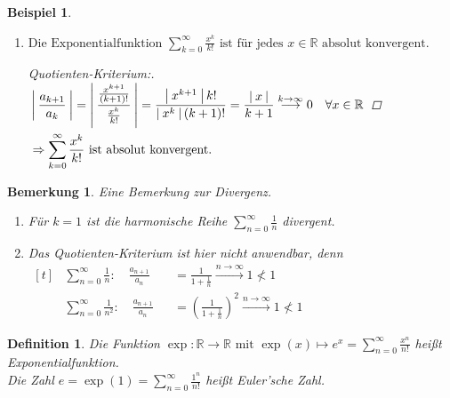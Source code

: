 \documentclass[a4paper,titlepage,oneside]{article}
\def\R{\ensuremath{\mathbb{R}} }
\def\e{\ensuremath{\mathit{e}} }
\def\sp{\hspace{0,1cm}}
\newcommand{\suminf}[2][n]{\ensuremath{\sum_{#1= 0}^{\infty}{#2}}}
\newcommand{\abs}[1]{\ensuremath{\left|\:#1\:\right|}}
\newcommand{\longtoinf}[1][n]{\ensuremath{\overset{\scriptscriptstyle{#1 \to \infty}}{\longrightarrow}}}
\theoremstyle{thmstyle}
\newtheorem{defi}[satz]{Definition}
\newtheorem{bsp}[satz]{Beispiel}
\newtheorem{bem}[satz]{Bemerkung}
\theoremstyle{subthmstyle}
\begin{document}
\begin{bsp}
\begin{enumerate}
\item
$\displaystyle\text{Die Exponentialfunktion } \suminf[k]{\frac{x^k}{k!}} \text{ ist für jedes } x \in \R \text{ absolut konvergent.}$

\begin{proof}[Quotienten-Kriterium:]\sp\\
\begin{math}\displaystyle \begin{aligned}[t]
&\abs{\frac{a_{k+1}}{a_k}} = \abs{\frac{\frac{x^{k+1}}{(k+1)!}}{\frac{x^k}{k!}}} = \frac{\abs{x^{k+1}} k!}{\abs{x^k} (k+1)!} = \frac{\abs{x}}{k+1} \overset{k \to \infty}{\longrightarrow} 0 \quad \forall x \in \R \\
&\Rightarrow \suminf[k]{\frac{x^k}{k!}} \text{ ist absolut konvergent.}
\end{aligned}\\\end{math}
\end{proof}
\end{enumerate}
\end{bsp}

\begin{bem}
Eine Bemerkung zur Divergenz.
\begin{enumerate}
\item Für \(k = 1\) ist die harmonische Reihe $\displaystyle \suminf{\frac{1}{n}} $ divergent.
\item Das Quotienten-Kriterium ist hier nicht anwendbar, denn \\
\begin{math}\displaystyle \begin{aligned}[t]
&\suminf{\frac{1}{n}} : \quad \frac{a_{n+1}}{a_n} &&= \frac{1}{1 + \frac{1}{n}} \longtoinf 1 \not < 1 \\
&\suminf{\frac{1}{n^2}} : \quad \frac{a_{n+1}}{a_n} &&= \left(\frac{1}{1 + \frac{1}{n}}\right)^2 \longtoinf 1 \not < 1
\end{aligned}\end{math} 
\end{enumerate}
\end{bem}

\begin{defi}
Die Funktion $ \displaystyle \exp: \R \to \R \text{ mit } \exp(x) \mapsto \e^x = \suminf{\frac{x^n}{n!}}$ heißt Exponentialfunktion.\\
Die Zahl $ \displaystyle \e = \exp(1) = \suminf{\frac{1^n}{n!}} $ heißt Euler'sche Zahl.
\end{defi}
\end{document}
